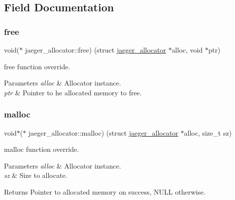 \subsection{Field Documentation}
\mbox{\label{structjaeger__allocator_a740ff44da0e720a728593e26bf58acc4}} 
\subsubsection{\texorpdfstring{free}{free}}
{\footnotesize\ttfamily void($\ast$ jaeger\+\_\+allocator\+::free) (struct \mbox{\hyperlink{structjaeger__allocator}{jaeger\+\_\+allocator}} $\ast$alloc, void $\ast$ptr)}



free function override. 


\begin{DoxyParams}{Parameters}
{\em alloc} & Allocator instance. \\
\hline
{\em ptr} & Pointer to he allocated memory to free. \\
\hline
\end{DoxyParams}
\mbox{\label{structjaeger__allocator_a235caded5cb561736c69c28b47169864}} 
\subsubsection{\texorpdfstring{malloc}{malloc}}
{\footnotesize\ttfamily void$\ast$($\ast$ jaeger\+\_\+allocator\+::malloc) (struct \mbox{\hyperlink{structjaeger__allocator}{jaeger\+\_\+allocator}} $\ast$alloc, size\+\_\+t sz)}



malloc function override. 


\begin{DoxyParams}{Parameters}
{\em alloc} & Allocator instance. \\
\hline
{\em sz} & Size to allocate. \\
\hline
\end{DoxyParams}
\begin{DoxyReturn}{Returns}
Pointer to allocated memory on success, N\+U\+LL otherwise. 
\end{DoxyReturn}
\mbox{\label{structjaeger__allocator_a17a8373babb00b98a1303cafaf524676}} 
